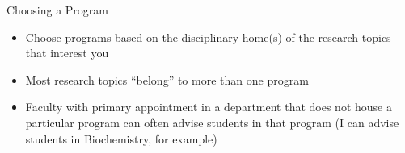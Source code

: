 \begin{frame}[fragile]{Choosing a Program}
\begin{itemize}
    \item Choose programs based on the disciplinary home(s) of the research topics that interest you
    \item Most research topics ``belong'' to more than one program
    \item Faculty with primary appointment in a department that does not house a particular program can often advise students in that program (I can advise students in Biochemistry, for example)
\end{itemize}
\end{frame}

